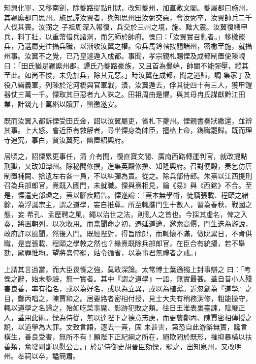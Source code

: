 \begin{pinyinscope}
 知興化軍，又移南劍，除夔路提點刑獄，改知夔州，加直敷文閣。夔屬郡曰施州，其羈縻郡曰思州。施民譚汝翼者，與知思州田汝弼交惡，會汝弼卒，汝翼帥兵二千人伐其喪。汝弼之
 子祖周深入報復，兵交於三州之境，施、黜大震。汝翼復繕甲兵，料丁壯，以重幣借兵諸洞，而乞師於帥府。慄曰：「汝翼實召亂者。」移檄罷兵，乃選屬吏往攝兵職，以漸收汝翼之權。命兵馬鈐轄按閱諸州，密檄至施，就攝州事。汝翼不之覺，已乃皇遽遁入成都。事聞，孝宗親札賜慄及成都制置使陳峴曰：「田氏猶是羈縻州郡，譚氏乃夔路豪族，又且首為釁端，帥閫不能彈壓，縱其至此。如尚不悛，未免加兵，除其元惡。」時汝翼在成都，聞之逃歸，調
 集家丁及役八砦義軍，列陳於沱河橋與官軍戰，潰，汝翼遁去，俘其徒四十有三人，獲甲鎧器仗三萬一千。慄取其巨惡者九人誅之。田祖周由是懼，與其母冉氏謀獻黔江田業，計錢九十萬緡以贖罪，蠻徼遂安。



 既而汝翼入都訴慄受田氏金，詔以汝翼屬吏，省札下夔州。慄親書奏狀繳還，並辨其事。上大怒。會近臣有救解者，尋坐慄身為帥臣，擅格上命，鐫職罷歸。既而理寺追究，事白，貸汝翼死，幽置紹興府。



 居頃之，詔慄累更事任，清
 介有聞，復直寶文閣、廣南西路轉運判官，就改提點刑獄，又改知潭州。除秘閣修撰，進集英殿修撰、知隆興府。召對便殿，奏乞仿唐制置補闕、拾遺左右各一員，不以糾彈為責。從之。除兵部侍郎。朱熹以江西提刑召為兵部郎官，熹既入國門，未就職。慄與熹相見，論《易》與《西銘》不合。至是，慄遣吏部趣之，熹以腳疾請告。慄遂論：「熹本無學術，徒竊張載、程頤之緒餘，為浮誕宗主，謂之道學，妄自推尊。所至輒攜門生十數人，習為春秋、戰國之態，妄
 希孔、孟歷聘之風，繩以治世之法，則亂人之首也。今採其虛名，俾之入奏，將置朝列，以次收用。而熹聞命之初，遷延道途，邀索高價，門生迭為游說，政府許以風聞，然後入門。既經陛對，得旨除郎，而輒懷不滿，傲睨累日，不肯供職，是豈張載、程頤之學教之然也？緣熹既除兵部郎官，在臣合有統攝，若不舉劾，厥罪惟均。望將熹停罷，姑令循省，以為事君無禮者之戒。」



 上謂其言過當，而大臣畏慄之強，莫敢深論。太常博士葉適獨上封事辯之
 曰：「考慄之辭，始末參驗，無一實者。其中『謂之道學』一語，無實最甚。蓋自昔小人殘害良善，率有指名，或以為好名，或以為立異，或以為植黨。近忽創為『道學』之目，鄭丙唱之，陳賈和之。居要路者密相付授，見士大夫有稍務潔修，粗能操守，輒以道學之名歸之，殆如吃菜事魔、影跡犯敗之類。往日王淮表裏臺諫，陰廢正人，蓋用此術。慄為侍從，無以達陛下之德意志慮，而更襲鄭丙、陳賈密相傳授之說，以道學為大罪。文致言語，逐去一熹，固
 未甚害，第恐自此游辭無實，讒言橫生，善良受害，無所不有！願陛下正紀綱之所在，絕欺罔於既形，摧抑暴橫以扶善類，奮發剛斷以慰公言。」於是侍御史胡晉臣劾慄，罷之，出知泉州，又改明州。奉祠以卒，謚簡肅。




\end{pinyinscope}

